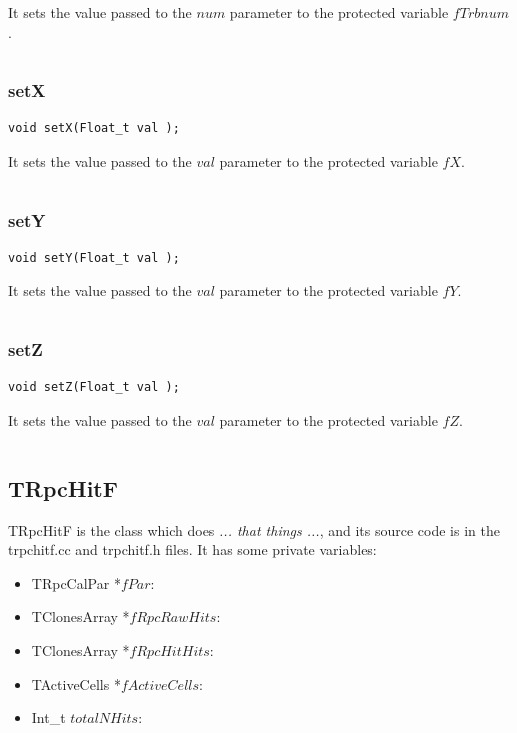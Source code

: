 \documentclass[a4paper]{book}
\begin{document}
It sets the value passed to the $num$ parameter to the protected variable $fTrbnum$.

\[\]

\subsubsection{setX}

\begin{lstlisting}
void setX(Float_t val );
\end{lstlisting}

It sets the value passed to the $val$ parameter to the protected variable $fX$.

\[\]

\subsubsection{setY}

\begin{lstlisting}
void setY(Float_t val );
\end{lstlisting}

It sets the value passed to the $val$ parameter to the protected variable $fY$.

\[\]

\subsubsection{setZ}

\begin{lstlisting}
void setZ(Float_t val );
\end{lstlisting}

It sets the value passed to the $val$ parameter to the protected variable $fZ$.

\[\]

\subsection{TRpcHitF}

TRpcHitF is the class which does \textit{... that things ...}, and its source code is in the trpchitf.cc and trpchitf.h files. It has some private variables:

\begin{itemize}
    \item TRpcCalPar *$fPar$: 
    \item TClonesArray *$fRpcRawHits$: 
    \item TClonesArray *$fRpcHitHits$: 
    \item TActiveCells *$fActiveCells$: 
    \item Int\_t $totalNHits$: 
\end{itemize}
\end{document}
